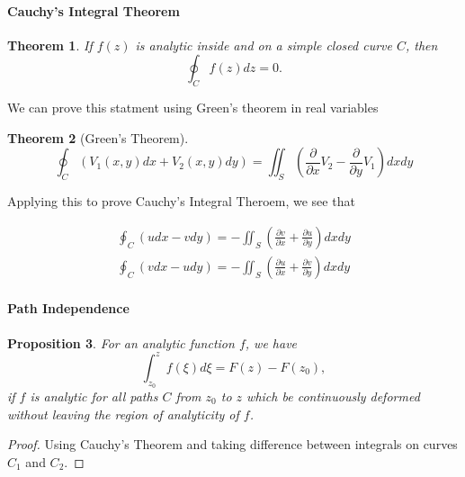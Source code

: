 \documentclass[12pt]{article}
\newcommand{\pdiff}[2]{\frac{\partial #1}{\partial #2}}
\newtheorem{thm}{Theorem}[section]
\newtheorem{prop}[thm]{Proposition}
\theoremstyle{definition}
\theoremstyle{remark}
\numberwithin{equation}{section}
\begin{document}
\paragraph{Cauchy's Integral Theorem}%
\label{par:cauchy_s_integral_theorem}

\begin{thm}
  If $f(z)$ is analytic inside and on a simple closed curve $C$, then 
  \begin{equation}
    \oint_C f(z) dz = 0.
  \end{equation}
\end{thm}

We can prove this statment using Green's theorem in real variables

\begin{thm}[Green's Theorem]
\begin{equation}
  \oint_C (V_1(x,y)dx + V_2(x,y)dy) = \iint_S \left(\pdiff{}{x}V_2 - \pdiff{}{y}V_1\right)dxdy
\end{equation}
\end{thm}



Applying this to prove Cauchy's Integral Theroem, we see that 

\begin{align}
  \oint_C (u dx - vdy) = - \iint_S \left( \pdiff{v}{x} + \pdiff{u}{y}\right) dxdy \\
  \oint_C (v dx - udy) = - \iint_S \left( \pdiff{u}{x} + \pdiff{v}{y}\right) dxdy 
\end{align}

\paragraph{Path Independence}%
\label{par:path_independence}

\begin{prop}
For an analytic function $f$, we have
\begin{equation}
  \int_{z_0}^{z} f(\xi) d\xi = F(z) - F(z_0),
\end{equation}
if $f$ is analytic for all paths $C$ from $z_0$ to $z$ which be continuously deformed without leaving the region of analyticity of $f$. 
\end{prop}
\begin{proof}
  Using Cauchy's Theorem and taking difference between integrals on curves $C_1$ and $C_2$.
\end{proof}
\end{document}
